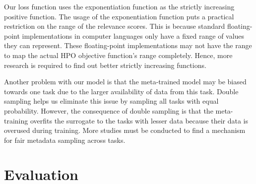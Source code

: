 \documentclass[12pt, twoside, ngerman]{report}
\begin{document}
Our loss function uses the exponentiation function as the strictly increasing positive function.
The usage of the exponentiation function puts a practical restriction on the range of the relevance scores. This is because standard floating-point implementations in computer languages only have a fixed range of values they can represent.
These floating-point implementations may not have the range to map the actual HPO objective function's range completely.
Hence, more research is required to find out better strictly increasing functions.

Another problem with our model is that the meta-trained model may be biased towards one task due to the larger availability of data from this task.
Double sampling helps us eliminate this issue by sampling all tasks with equal probability.
However, the consequence of double sampling is that the meta-training overfits the surrogate to the tasks with lesser data because their data is overused during training. More studies must be conducted to find a mechanism for fair metadata sampling across tasks.

    

\iffalse
\section{Evaluation}
\end{document}

